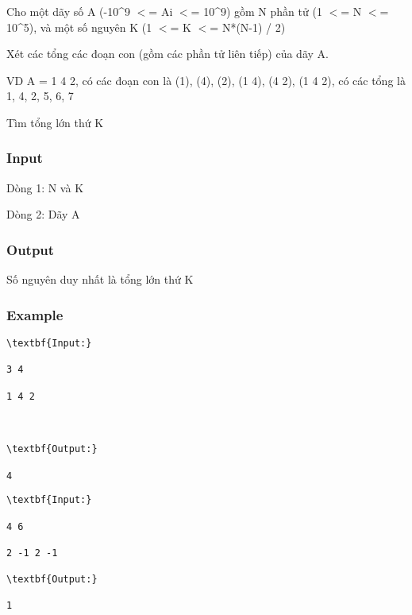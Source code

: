 

Cho một dãy số A (-10\textasciicircum9 $<$= Ai $<$= 10\textasciicircum9) gồm N phần tử (1 $<$= N $<$= 10\textasciicircum5), và một số nguyên K (1 $<$= K $<$= N*(N-1) / 2)

Xét các tổng các đoạn con (gồm các phần tử liên tiếp) của dãy A.

VD A = 1 4 2, có các đoạn con là (1), (4), (2), (1 4), (4 2), (1 4 2), có các tổng là 1, 4, 2, 5, 6, 7

Tìm tổng lớn thứ K

\subsubsection{Input}

Dòng 1: N và K

Dòng 2: Dãy A

\subsubsection{Output}

Số nguyên duy nhất là tổng lớn thứ K

\subsubsection{Example}
\begin{verbatim}
\textbf{Input:}

3 4

1 4 2



\textbf{Output:}

4

\end{verbatim}
\begin{verbatim}
\textbf{Input:}

4 6

2 -1 2 -1

\textbf{Output:}

1

\end{verbatim}
